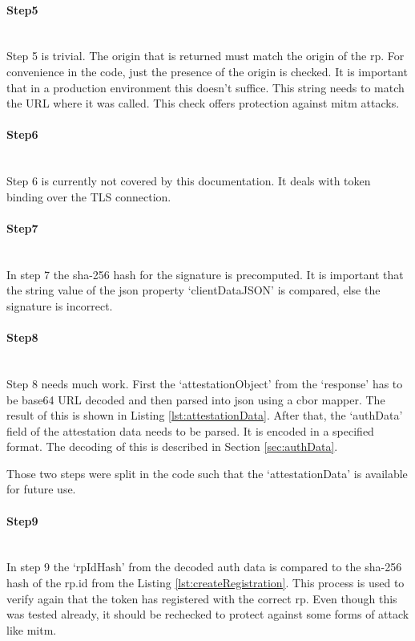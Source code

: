 \documentclass[a4paper, 11pt]{scrartcl}
\begin{document}
\paragraph{Step5}\hfill \\ 
Step 5 is trivial. The origin that is returned must match the origin of the \gls{rp}. For convenience in the code, just the presence of the origin is checked. It is important that in a production environment this doesn't suffice. This string needs to match the URL where it was called. This check offers protection against \gls{mitm} attacks.

\paragraph{Step6}\hfill \\ 
Step 6 is currently not covered by this documentation. It deals with token binding over the TLS connection.

\paragraph{Step7}\hfill \\ 
In step 7 the \gls{sha-256} hash for the signature is precomputed. It is important that the string value of the \gls{json} property `clientDataJSON' is compared, else the signature is incorrect.

\paragraph{Step8}\hfill \\ 
Step 8 needs much work. First the `attestationObject' from the `response' has to be \gls{base64} URL decoded and then parsed into \gls{json} using a \gls{cbor} mapper. The result of this is shown in Listing \ref{lst:attestationData}. After that, the `authData' field of the attestation data needs to be parsed. It is encoded in a specified format. The decoding of this is described in Section \ref{sec:authData}\cite{webauthn:authData}.

Those two steps were split in the code such that the `attestationData' is available for future use.



\paragraph{Step9}\hfill \\ 
In step 9 the `rpIdHash' from the decoded auth data is compared to the \gls{sha-256} hash of the rp.id from the Listing \ref{lst:createRegistration}. This process is used to verify again that the token has registered with the correct \gls{rp}. Even though this was tested already, it should be rechecked to protect against some forms of attack like \gls{mitm}. 
\end{document}
